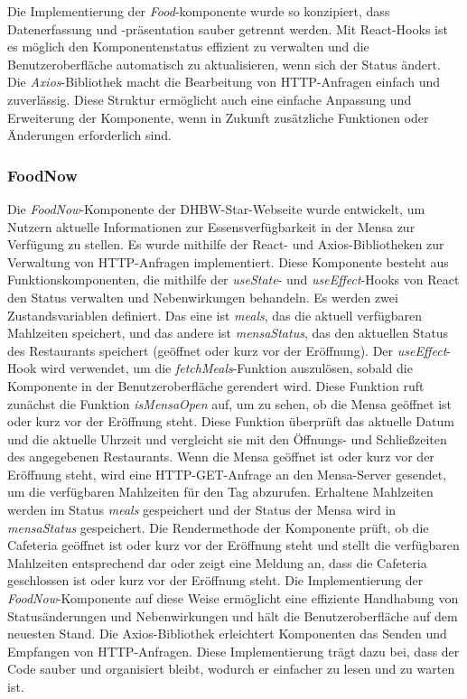 Die Implementierung der \emph{Food}-komponente wurde so konzipiert, dass Datenerfassung und -präsentation sauber getrennt werden. Mit React-Hooks ist es möglich den Komponentenstatus effizient zu verwalten und die Benutzeroberfläche automatisch zu aktualisieren, wenn sich der Status ändert. Die \emph{Axios}-Bibliothek macht die Bearbeitung von HTTP-Anfragen einfach und zuverlässig. Diese Struktur ermöglicht auch eine einfache Anpassung und Erweiterung der Komponente, wenn in Zukunft zusätzliche Funktionen oder Änderungen erforderlich sind.

\subsubsection{FoodNow}
Die \emph{FoodNow}-Komponente der DHBW-Star-Webseite wurde entwickelt, um Nutzern aktuelle Informationen zur Essensverfügbarkeit in der Mensa zur Verfügung zu stellen. Es wurde mithilfe der React- und Axios-Bibliotheken zur Verwaltung von HTTP-Anfragen implementiert. 
Diese Komponente besteht aus Funktionskomponenten, die mithilfe der \emph{useState}- und \emph{useEffect}-Hooks von React den Status verwalten und Nebenwirkungen behandeln. Es werden zwei Zustandsvariablen definiert. Das eine ist \emph{meals}, das die aktuell verfügbaren Mahlzeiten speichert, und das andere ist \emph{mensaStatus}, das den aktuellen Status des Restaurants speichert (geöffnet oder kurz vor der Eröffnung). 
Der \emph{useEffect}-Hook wird verwendet, um die \emph{fetchMeals}-Funktion auszulösen, sobald die Komponente in der Benutzeroberfläche gerendert wird. Diese Funktion ruft zunächst die Funktion \emph{isMensaOpen} auf, um zu sehen, ob die Mensa geöffnet ist oder kurz vor der Eröffnung steht. Diese Funktion überprüft das aktuelle Datum und die aktuelle Uhrzeit und vergleicht sie mit den  Öffnungs- und Schließzeiten des angegebenen Restaurants. 
Wenn die Mensa geöffnet ist oder kurz vor der Eröffnung steht, wird eine HTTP-GET-Anfrage an den Mensa-Server gesendet, um die verfügbaren Mahlzeiten für den  Tag abzurufen. Erhaltene Mahlzeiten werden  im Status \emph{meals} gespeichert und der Status der Mensa wird in \emph{mensaStatus} gespeichert. 
Die Rendermethode der Komponente prüft, ob die Cafeteria geöffnet ist oder kurz vor der Eröffnung steht und stellt die verfügbaren Mahlzeiten entsprechend dar oder zeigt eine Meldung an, dass die Cafeteria geschlossen ist oder kurz vor der Eröffnung steht. Die Implementierung der \emph{FoodNow}-Komponente auf diese Weise ermöglicht eine effiziente Handhabung von Statusänderungen und Nebenwirkungen und hält die Benutzeroberfläche auf dem neuesten Stand. Die Axios-Bibliothek erleichtert Komponenten das Senden und Empfangen von HTTP-Anfragen. Diese Implementierung trägt dazu bei, dass der Code sauber und  organisiert bleibt, wodurch er einfacher zu lesen und zu warten ist.
